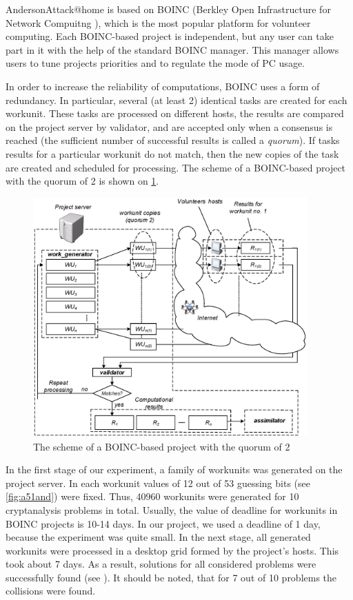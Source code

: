 \documentclass[runningheads,a4paper]{llncs}[2015/06/24]
\begin{document}
AndersonAttack@home is based on BOINC (Berkley Open Infrastructure for Network
Compuitng \cite{Anderson:2004:BSP:1032646.1033223}), which is the most popular platform for
volunteer computing. Each BOINC-based project is independent, but any user can take part in it 
with the help of the standard BOINC manager. This manager allows users to tune projects priorities and to
regulate the mode of PC usage. 

In order to increase the reliability of computations, BOINC uses a form of redundancy.
In particular, several (at least 2) identical tasks are created for each workunit. These tasks are processed
on different hosts, the results are compared on the project server by validator,
and are accepted only when a consensus is reached (the sufficient number of
successful results is called a \textit{quorum}). If tasks results for a particular workunit do not match, 
then the new copies of the task are created and scheduled for processing. The scheme of
a BOINC-based project with the quorum of 2 is shown on \cref{fig:boinc}.

\begin{figure}
	\centering
	\includegraphics[width=10.5cm]{./BOINC_project_scheme.eps}
	\caption{The scheme of a BOINC-based project with the quorum of 2} 
	\label{fig:boinc} 
\end{figure}

In the first stage of our experiment, a family of workunits was generated on 
the project server. In each workunit values of 12 out of 53 guessing bits (see \cref{fig:a51and}) were fixed. Thus, 40960 workunits were generated for 10 cryptanalysis problems in total. Usually, the value of deadline for workunits in BOINC projects is 10-14 days. In
our project, we used a deadline of 1 day, because the experiment was quite
small. In the next stage, all generated workunits were processed in a desktop
grid formed by the project's hosts. This took about 7 days. As a result, solutions
for all considered problems were successfully found (see ). It should be noted, 
that for 7 out of 10 problems the collisions were found.
\end{document}
